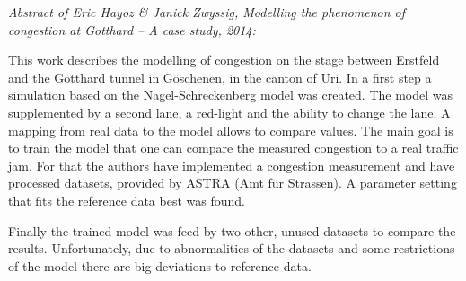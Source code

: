 \textit{Abstract of Eric Hayoz \& Janick Zwyssig, Modelling the phenomenon of congestion at Gotthard -- A case study, 2014:}

This work describes the modelling of congestion on the stage between Erstfeld and the Gotthard tunnel in Göschenen, in the canton of Uri. In a first step a simulation based on the Nagel-Schreckenberg model was created. The model was supplemented by a second lane, a red-light and the ability to change the lane. A mapping from real data to the model allows to compare values. 
The main goal is to train the model that one can compare the measured congestion to a real traffic jam. For that the authors have implemented a congestion measurement and have processed datasets, provided by ASTRA (Amt für Strassen). A parameter setting that fits the reference data best was found. 

Finally the trained model was feed by two other, unused datasets to compare the results. Unfortunately, due to abnormalities of the datasets and some restrictions of the model there are big deviations to reference data. 